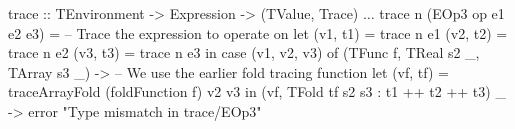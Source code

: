         \begin{haskell}[caption=Naive fold tracing, label=lst:trace_fold_naive, gobble=12]
            trace :: TEnvironment -> Expression -> (TValue, Trace)
            $\dots$
            trace n (EOp3 op e1 e2 e3) =
                -- Trace the expression to operate on
                let (v1, t1) = trace n e1
                    (v2, t2) = trace n e2
                    (v3, t3) = trace n e3
                in  case (v1, v2, v3) of
                    (TFunc f, TReal s2 _, TArray s3 _) -> 
                        -- We use the earlier fold tracing function
                        let (vf, tf) = traceArrayFold (foldFunction f) v2 v3
                        in  (vf, TFold tf s2 s3 : t1 ++ t2 ++ t3)
                    _                                  ->
                        error "Type mismatch in trace/EOp3"
        \end{haskell}

